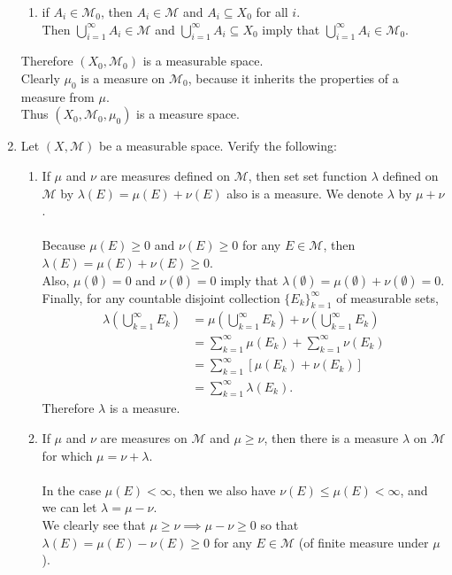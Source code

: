\begin{enumerate}
\begin{enumerate}[label=(\roman*),align=left]
		\item if $A_i\in\mathcal{M}_0$, then $A_i\in\mathcal{M}$ and $A_i\subseteq X_0$ for all $i$.\\
		Then $\bigcup_{i=1}^\infty A_i\in\mathcal{M}$ and $\bigcup_{i=1}^\infty A_i\subseteq X_0$ imply that $\bigcup_{i=1}^\infty A_i\in\mathcal{M}_0$.
	\end{enumerate}
	Therefore $(X_0,\mathcal{M}_0)$ is a measurable space.\\
	Clearly $\mu_0$ is a measure on $\mathcal{M}_0$, because it inherits the properties of a measure from $\mu$.\\
	Thus $(X_0,\mathcal{M}_0,\mu_0)$ is a measure space.
	\item Let $(X,\mathcal{M})$ be a measurable space. Verify the following:
	\begin{enumerate}[label=(\roman*),align=left]  
		\item If $\mu$ and $\nu$ are measures defined on $\mathcal{M}$, then set set function $\lambda$ defined on $\mathcal{M}$ by $\lambda(E)=\mu(E)+\nu(E)$ also is a measure. We denote $\lambda$ by $\mu+\nu$.\\
		\\Because $\mu(E)\ge 0$ and $\nu(E)\ge 0$ for any $E\in\mathcal{M}$, then $\lambda(E)=\mu(E)+\nu(E)\ge 0$.
		\\Also, $\mu(\emptyset)= 0$ and $\nu(\emptyset)= 0$ imply that $\lambda(\emptyset)=\mu(\emptyset)+\nu(\emptyset)= 0$.
		\\Finally, for any countable disjoint collection $\{E_k\}_{k=1}^\infty$ of measurable sets,
		\begin{align*}
			\lambda\left(\bigcup_{k=1}^\infty E_k\right)&=\mu\left(\bigcup_{k=1}^\infty E_k\right)+\nu\left(\bigcup_{k=1}^\infty E_k\right)\\
			&=\sum_{k=1}^\infty\mu(E_k)+\sum_{k=1}^\infty\nu(E_k)\\
			&=\sum_{k=1}^\infty[\mu(E_k)+\nu(E_k)]\\
			&=\sum_{k=1}^\infty\lambda(E_k).
		\end{align*}
		Therefore $\lambda$ is a measure.
		\item If $\mu$ and $\nu$ are measures on $\mathcal{M}$ and $\mu\ge\nu$, then there is a measure $\lambda$ on $\mathcal{M}$ for which $\mu=\nu+\lambda$.\\
		\\In the case $\mu(E)<\infty$, then we also have $\nu(E)\le\mu(E)<\infty$, and we can let $\lambda = \mu-\nu$.
		\\We clearly see that $\mu\ge\nu\implies\mu-\nu\ge0$ so that $\lambda(E)=\mu(E)-\nu(E)\ge 0$ for any $E\in\mathcal{M}$ (of finite measure under $\mu$).

\end{enumerate}
\end{enumerate}
